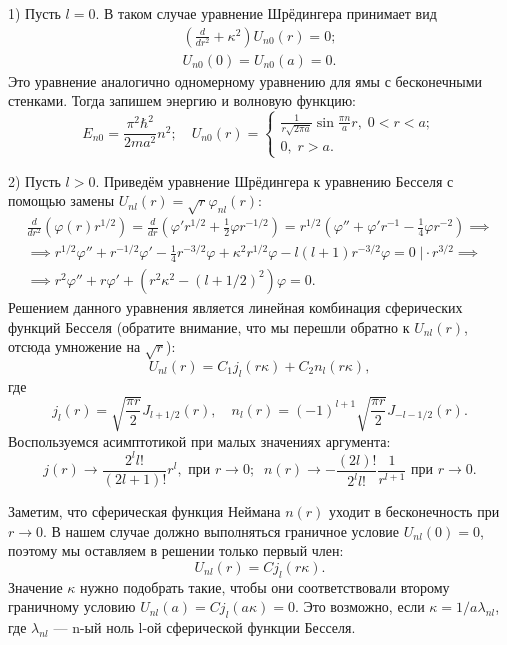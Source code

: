 1) Пусть $l = 0$. В таком случае уравнение Шрёдингера принимает вид
\begin{gather*}
  \left(\frac{d}{dr^2} + \kappa^2\right)U_{n0}(r) = 0;\\
  U_{n0}(0) = U_{n0}(a) = 0.
\end{gather*}
Это уравнение аналогично одномерному уравнению для ямы с бесконечными стенками.
Тогда запишем энергию и волновую функцию:
\[
  E_{n0} = \frac{\pi^2\hbar^2}{2ma^2}n^2; \quad U_{n0}(r) =
  \begin{cases}
    \frac{1}{r\sqrt{2\pi a}}\sin\frac{\pi n}{a}r, \; 0 < r < a;\\
    0, \; r > a.
  \end{cases}
\]

2) Пусть $l > 0$. Приведём уравнение Шрёдингера к уравнению Бесселя с помощью
замены $U_{nl}(r) = \sqrt{r}\varphi_{nl}(r)$:
\begin{gather*}
  \frac{d}{dr^2}\left(\varphi(r)r^{1/2}\right) = \frac{d}{dr}\left( \varphi'r^{1/2} + \frac{1}{2}\varphi r^{-1/2} \right) = r^{1/2}\left(\varphi'' + \varphi'r^{-1} - \frac{1}{4}\varphi r^{-2}\right) \implies \\
  \implies r^{1/2}\varphi'' + r^{-1/2}\varphi' - \frac{1}{4}r^{-3/2}\varphi + \kappa^2r^{1/2}\varphi - l(l+1)r^{-3/2}\varphi = 0 \; \Bigg| \cdot r^{3/2} \implies \\
  \implies r^2\varphi''+ r\varphi' + (r^2\kappa^2 - (l+1/2)^2)\varphi = 0.
\end{gather*}
Решением данного уравнения является линейная комбинация сферических функций
Бесселя (обратите внимание, что мы перешли обратно к $U_{nl}(r)$, отсюда
умножение на $\sqrt{r}$):
\[
  U_{nl}(r) = C_1j_l(r\kappa) + C_2n_l(r\kappa),
\]
где
\[
  j_l(r) = \sqrt{\frac{\pi r}{2}}J_{l+1/2}(r), \quad n_l(r) = (-1)^{l+1}\sqrt{\frac{\pi r}{2}}J_{-l-1/2}(r).
\]
Воспользуемся асимптотикой при малых значениях аргумента:
\[
  j(r)\rightarrow\frac{2^l l!}{(2l+1)!}r^l, \text{ при } r\rightarrow0; \;\; n(r)\rightarrow -\frac{(2l)!}{2^l l!}\frac{1}{r^{l+1}} \text{ при } r\rightarrow 0.
\]

Заметим, что сферическая функция Неймана $n(r)$ уходит в бесконечность при $r
  \rightarrow 0$. В нашем случае должно выполняться граничное условие $U_{nl}(0)
  = 0$, поэтому мы оставляем в решении только первый член:
\[
  U_{nl}(r) = Cj_l(r\kappa).
\]
Значение $\kappa$ нужно подобрать такие, чтобы они соответствовали второму
граничному условию $U_{nl}(a) = Cj_l(a\kappa) = 0$. Это возможно, если $\kappa
  = 1/a \lambda_{nl}$, где $\lambda_{nl}$ --- n-ый ноль l-ой сферической функции
Бесселя.

